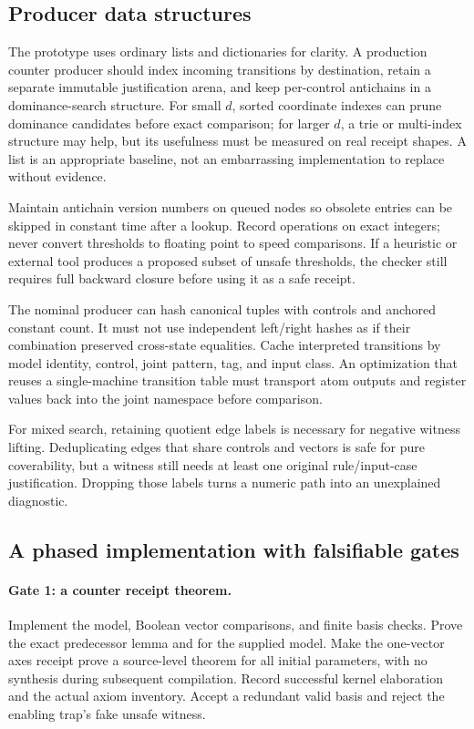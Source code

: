 \subsection{Producer data structures}
The prototype uses ordinary lists and dictionaries for clarity. A production
counter producer should index incoming transitions by destination, retain a
separate immutable justification arena, and keep per-control antichains in a
dominance-search structure. For small $d$, sorted coordinate indexes can prune
dominance candidates before exact comparison; for larger $d$, a trie or
multi-index structure may help, but its usefulness must be measured on real
receipt shapes. A list is an appropriate baseline, not an embarrassing
implementation to replace without evidence.

Maintain antichain version numbers on queued nodes so obsolete entries can be
skipped in constant time after a lookup. Record operations on exact integers;
never convert thresholds to floating point to speed comparisons. If a heuristic
or external tool produces a proposed subset of unsafe thresholds, the checker
still requires full backward closure before using it as a safe receipt.

The nominal producer can hash canonical tuples with controls and anchored
constant count. It must not use independent left/right hashes as if their
combination preserved cross-state equalities. Cache interpreted transitions by
model identity, control, joint pattern, tag, and input class. An optimization
that reuses a single-machine transition table must transport atom outputs and
register values back into the joint namespace before comparison.

For mixed search, retaining quotient edge labels is necessary for negative
witness lifting. Deduplicating edges that share controls and vectors is safe
for pure coverability, but a witness still needs at least one original
rule/input-case justification. Dropping those labels turns a numeric path into
an unexplained diagnostic.

\subsection{A phased implementation with falsifiable gates}
\paragraph{Gate 1: a counter receipt theorem.}
Implement the model, Boolean vector comparisons, and finite basis checks.
Prove the exact predecessor lemma and  for the supplied
model. Make the one-vector axes receipt prove a source-level theorem for all
initial parameters, with no synthesis during subsequent compilation. Record
successful kernel elaboration and the actual axiom inventory. Accept a
redundant valid basis and reject the enabling trap's fake unsafe witness.

